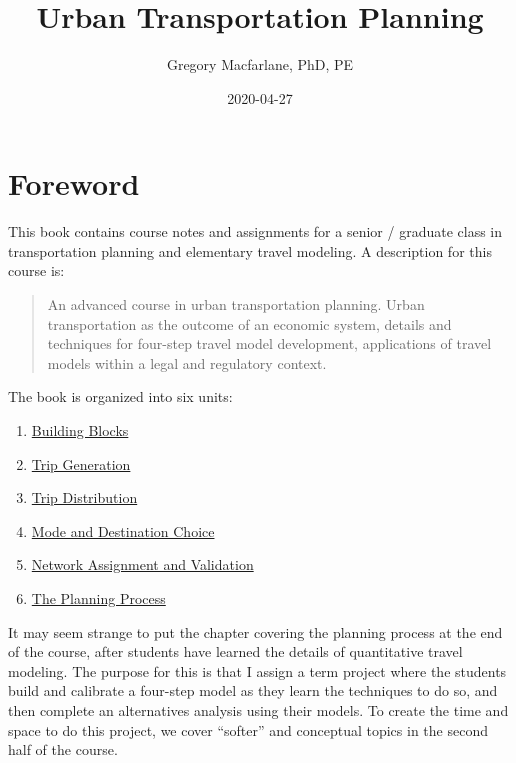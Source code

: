 \documentclass[]{book}
\title{Urban Transportation Planning}
\author{Gregory Macfarlane, PhD, PE}
\date{2020-04-27}
\providecommand{\tightlist}{%
  \setlength{\itemsep}{0pt}\setlength{\parskip}{0pt}}
\begin{document}
\maketitle

{
\setcounter{tocdepth}{1}
\tableofcontents
}
\hypertarget{syllabus}{%
\chapter*{Foreword}\label{syllabus}}

This book contains course notes and assignments for a senior / graduate class in
transportation planning and elementary travel modeling. A description for this course
is:

\begin{quote}
An advanced course in urban transportation planning. Urban transportation as
the outcome of an economic system, details and techniques for four-step travel
model development, applications of travel models within a legal and regulatory
context.
\end{quote}

The book is organized into six units:

\begin{enumerate}
\def\labelenumi{\arabic{enumi}.}
\tightlist
\item
  \protect\hyperlink{chap-blocks}{Building Blocks}
\item
  \protect\hyperlink{chap-tripgen}{Trip Generation}
\item
  \protect\hyperlink{chap-distribution}{Trip Distribution}
\item
  \protect\hyperlink{chap-modechoice}{Mode and Destination Choice}
\item
  \protect\hyperlink{chap-assignment}{Network Assignment and Validation}
\item
  \protect\hyperlink{chap-process}{The Planning Process}
\end{enumerate}

It may seem strange to put the chapter covering the planning process at the end
of the course, after students have learned the details of quantitative travel
modeling. The purpose for this is that I assign a term project where the
students build and calibrate a four-step model as they learn the techniques to do
so, and then complete an alternatives analysis using their models. To create
the time and space to do this project, we cover ``softer'' and conceptual topics
in the second half of the course.
\end{document}
